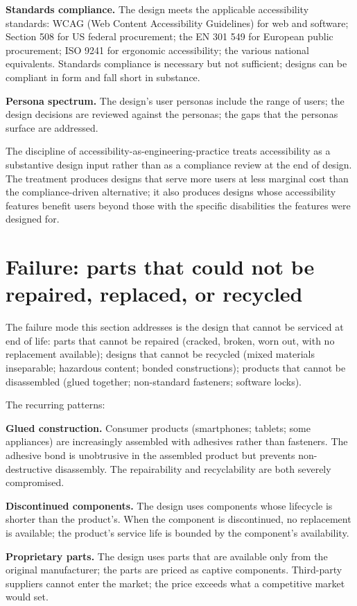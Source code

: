 \textbf{Standards compliance.} The design meets the applicable accessibility standards: WCAG (Web Content Accessibility Guidelines) for web and software; Section 508 for US federal procurement; the EN 301 549 for European public procurement; ISO 9241 for ergonomic accessibility; the various national equivalents. Standards compliance is necessary but not sufficient; designs can be compliant in form and fall short in substance.

\textbf{Persona spectrum.} The design's user personas include the range of users; the design decisions are reviewed against the personas; the gaps that the personas surface are addressed.

The discipline of accessibility-as-engineering-practice treats accessibility as a substantive design input rather than as a compliance review at the end of design. The treatment produces designs that serve more users at less marginal cost than the compliance-driven alternative; it also produces designs whose accessibility features benefit users beyond those with the specific disabilities the features were designed for.

\section{Failure: parts that could not be repaired, replaced, or recycled}

The failure mode this section addresses is the design that cannot be serviced at end of life: parts that cannot be repaired (cracked, broken, worn out, with no replacement available); designs that cannot be recycled (mixed materials inseparable; hazardous content; bonded constructions); products that cannot be disassembled (glued together; non-standard fasteners; software locks).

The recurring patterns:

\textbf{Glued construction.} Consumer products (smartphones; tablets; some appliances) are increasingly assembled with adhesives rather than fasteners. The adhesive bond is unobtrusive in the assembled product but prevents non-destructive disassembly. The repairability and recyclability are both severely compromised.

\textbf{Discontinued components.} The design uses components whose lifecycle is shorter than the product's. When the component is discontinued, no replacement is available; the product's service life is bounded by the component's availability.

\textbf{Proprietary parts.} The design uses parts that are available only from the original manufacturer; the parts are priced as captive components. Third-party suppliers cannot enter the market; the price exceeds what a competitive market would set.

